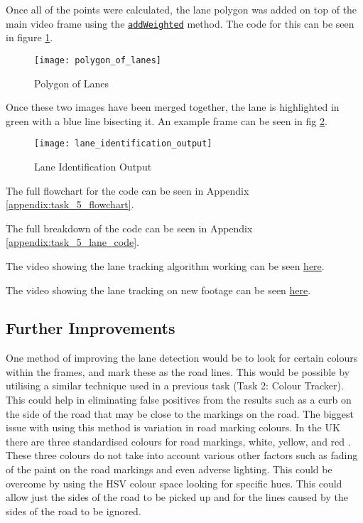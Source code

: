 \documentclass[conference]{IEEEtran}
\begin{document}
Once all of the points were calculated, the lane polygon was added on top of the main video frame using the \href{https://docs.opencv.org/4.x/d2/de8/group__core__array.html#gafafb2513349db3bcff51f54ee5592a19}{\texttt{addWeighted}} method. The code for this can be seen in figure \ref{fig:polygon_of_lanes}.

\begin{figure}[H]
\centerline{\texttt{[image: polygon\_of\_lanes]}}
\caption{Polygon of Lanes}
\label{fig:polygon_of_lanes}
\end{figure}

Once these two images have been merged together, the lane is highlighted in green with a blue line bisecting it. An example frame can be seen in fig \ref{fig:lane_identification_output}.

\begin{figure}[H]
\centerline{\texttt{[image: lane\_identification\_output]}}
\caption{Lane Identification Output}
\label{fig:lane_identification_output}
\end{figure}

The full flowchart for the code can be seen in Appendix \ref{appendix:task_5_flowchart}.

The full breakdown of the code can be seen in Appendix \ref{appendix:task_5_lane_code}.

The video showing the lane tracking algorithm working can be seen \href{https://youtu.be/Xw9haUy82Ps}{here}.

The video showing the lane tracking on new footage can be seen \href{https://youtu.be/3RjcQkaabNI}{here}.


\subsection{Further Improvements}

One method of improving the lane detection would be to look for certain colours within the frames, and mark these as the road lines. This would be possible by utilising a similar technique used in a previous task (Task 2: Colour Tracker). This could help in eliminating false positives from the results such as a curb on the side of the road that may be close to the markings on the road. The biggest issue with using this method is variation in road marking colours. In the UK there are three standardised colours for road markings, white, yellow, and red \cite{road_markings}. These three colours do not take into account various other factors such as fading of the paint on the road markings and even adverse lighting. This could be overcome by using the HSV colour space looking for specific hues. This could allow just the sides of the road to be picked up and  for the lines caused by the sides of the road to be ignored. 
\end{document}
